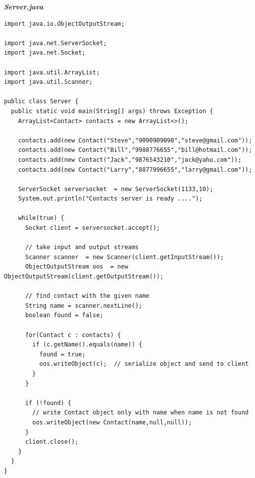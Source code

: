 \documentclass[11pt, twocolumn]{article}
\begin{document}
  \textit{\textbf{Server.java}}
  \begin{lstlisting}
import java.io.ObjectOutputStream;

import java.net.ServerSocket;
import java.net.Socket;

import java.util.ArrayList;
import java.util.Scanner;

public class Server {
  public static void main(String[] args) throws Exception {
    ArrayList<Contact> contacts = new ArrayList<>();

    contacts.add(new Contact("Steve","9090909090","steve@gmail.com"));
    contacts.add(new Contact("Bill","9988776655","bill@hotmail.com"));
    contacts.add(new Contact("Jack","9876543210","jack@yaho.com"));
    contacts.add(new Contact("Larry","8877996655","larry@gmail.com"));

    ServerSocket serversocket  = new ServerSocket(1133,10);
    System.out.println("Contacts server is ready ....");

    while(true) {
      Socket client = serversocket.accept();

      // take input and output streams
      Scanner scanner  = new Scanner(client.getInputStream());
      ObjectOutputStream oos  = new ObjectOutputStream(client.getOutputStream());

      // find contact with the given name
      String name = scanner.nextLine();
      boolean found = false;

      for(Contact c : contacts) {
        if (c.getName().equals(name)) {
          found = true;
          oos.writeObject(c);  // serialize object and send to client
        }
      }
      
      if (!found) {
        // write Contact object only with name when name is not found
        oos.writeObject(new Contact(name,null,null));
      }
      client.close();
    } 
  }
}
  \end{lstlisting}
\end{document}
